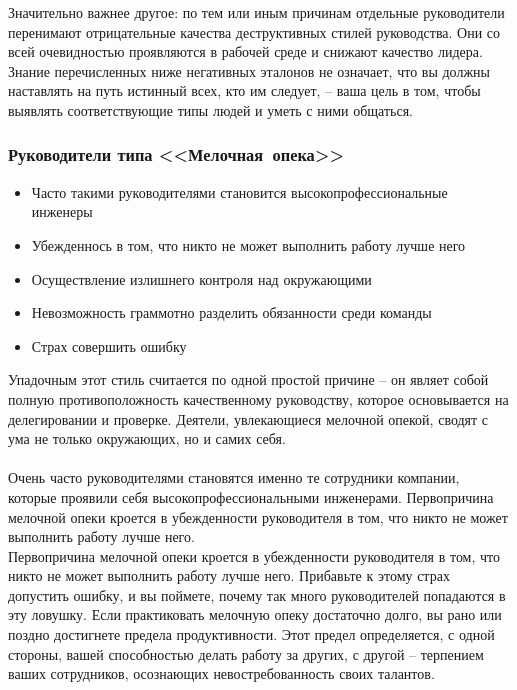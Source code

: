 \documentclass{../industrial-development}
\begin{document}
{Значительно важнее другое: по тем или иным причинам отдельные руководители перенимают отрицательные качества деструктивных стилей руководства. Они со всей очевидностью проявляются в рабочей среде и снижают качество лидера. Знание перечисленных ниже негативных эталонов не означает, что вы должны наставлять на путь истинный всех, кто им следует, – ваша цель в том, чтобы выявлять соответствующие типы людей и уметь с ними общаться. 




\begin{frame} \frametitle{Руководители типа <<Мелочная~опека>>}
\begin{itemize}
		\item Часто такими руководителями становится высокопрофессиональные инженеры
		\item Убежденнось в том, что никто не может выполнить работу лучше него
		\item Осуществление излишнего контроля над окружающими
		\item Невозможность граммотно разделить обязанности среди команды
		\item Страх совершить ошибку
	\end{itemize}
\end{frame}
\lecturenotes
	Упадочным этот стиль считается по одной простой причине – он являет собой полную противоположность качественному руководству, которое основывается на делегировании и проверке. Деятели, увлекающиеся мелочной опекой, сводят с ума не только окружающих, но и самих себя. \\~\\
Очень часто руководителями становятся именно те сотрудники компании, которые проявили себя высокопрофессиональными инженерами. Первопричина мелочной опеки кроется в убежденности руководителя в том, что никто не может выполнить работу лучше него.  \\
Первопричина мелочной опеки кроется в убежденности руководителя в том, что никто не может выполнить работу лучше него. Прибавьте к этому страх допустить ошибку, и вы поймете, почему так много руководителей попадаются в эту ловушку. Если практиковать мелочную опеку достаточно долго, вы рано или поздно достигнете предела продуктивности. Этот предел определяется, с одной стороны, вашей способностью делать работу за других, с другой – терпением ваших сотрудников, осознающих невостребованность своих талантов.




}
\end{document}
